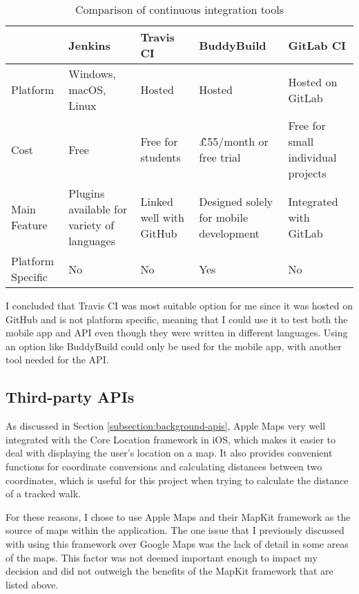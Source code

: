 \begin{table}[hbt]
  \centering
  \begin{tabular}{|m{1.5cm}||M{3cm}|M{3cm}|M{3cm}|M{3cm}|}
    \hline
     & \textbf{Jenkins} & \textbf{Travis CI} & \textbf{BuddyBuild} & \textbf{GitLab CI} \\
    \hline
    \hline
    Platform & Windows, macOS, Linux & Hosted & Hosted & Hosted on GitLab\\
    \hline
    Cost & Free & Free for students & \~\pounds55/month or free trial & Free for small individual projects\\
    \hline
    Main Feature & Plugins available for variety of languages & Linked well with GitHub & Designed solely for mobile development & Integrated with GitLab\\
    \hline
    Platform Specific & No & No & Yes & No\\
    \hline
  \end{tabular}
  \caption{Comparison of continuous integration tools}
  \label{table:ci-tools-options}
\end{table}




I concluded that Travis CI was most suitable option for me since it was hosted on GitHub and is not platform specific, meaning that I could use it to test both the mobile app and API even though they were written in different languages. Using an option like BuddyBuild could only be used for the mobile app, with another tool needed for the API.

\subsection{Third-party APIs}

As discussed in Section \ref{subsection:background-apis}, Apple Maps very well integrated with the Core Location framework in iOS, which makes it easier to deal with displaying the user's location on a map. It also provides convenient functions for coordinate conversions and calculating distances between two coordinates, which is useful for this project when trying to calculate the distance of a tracked walk.

For these reasons, I chose to use Apple Maps and their MapKit framework as the source of maps within the application. The one issue that I previously discussed with using this framework over Google Maps was the lack of detail in some areas of the maps. This factor was not deemed important enough to impact my decision and did not outweigh the benefits of the MapKit framework that are listed above.

